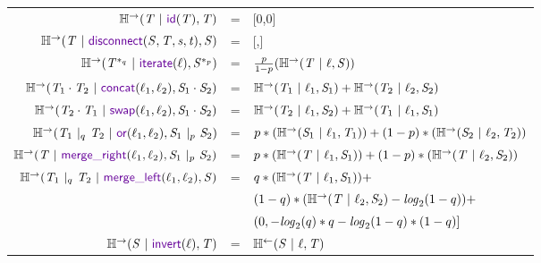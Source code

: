 \documentclass[acmsmall,screen,anonymous]{acmart}
\begin{document}
\begin{center}
  \begin{tabular}{rcl}
    $\REntropyOf{\RegexAlt \Given \IdentityLensOf{\RegexAlt}, \RegexAlt}$
    & =
    & [0,0]\\
    
    $\REntropyOf{\RegexAlt \Given \DisconnectOf{\Regex}{\RegexAlt}{\String}{\StringAlt}, \Regex}$
    & =
    & [\EntropyOf{\RegexAlt},\EntropyOf{\RegexAlt}]\\

    $\REntropyOf{\PRegexStar{\RegexAlt}{\ProbabilityAlt} \Given \IterateLensOf{\Lens}, \PRegexStar{\Regex}{\Probability}}$
    & =
    & $\frac{p}{1-p}(\mathbb{H}^\rightarrow(\mathit{T} ~|~ \mathit{\ell}, \mathit{S}))$\\
    
    $\REntropyOf{\RegexAlt_1 \Concat \RegexAlt_2 \Given \ConcatLensOf{\Lens_1}{\Lens_2}, \Regex_1 \Concat \Regex_2}$
    & =
    & $\mathbb{H}^\rightarrow(\mathit{T}_1 ~|~ \mathit{\ell}_1, \mathit{S}_1) + \mathbb{H}^\rightarrow(\mathit{T}_2 ~|~ \mathit{\ell}_2, \mathit{S}_2)$\\
    
    $\REntropyOf{\RegexAlt_2 \Concat \RegexAlt_1 \Given \SwapLensOf{\Lens_1}{\Lens_2}, \Regex_1 \Concat \Regex_2}$
    & =
    & $\mathbb{H}^\rightarrow(\mathit{T}_2 ~|~ \mathit{\ell}_1, \mathit{S}_2) + \mathbb{H}^\rightarrow(\mathit{T}_1 ~|~ \mathit{\ell}_1, \mathit{S}_1)$\\
    
    $\REntropyOf{\PRegexOr{\RegexAlt_1}{\RegexAlt_2}{\ProbabilityAlt} \Given \OrLensOf{\Lens_1}{\Lens_2}, \PRegexOr{\Regex_1}{\Regex_2}{\Probability}}$
    & =
    & $p*(\mathbb{H}^\rightarrow(\mathit{S}_1 ~|~ \mathit{\ell}_1, \mathit{T}_1) ) + (1-p)*(\mathbb{H}^\rightarrow(\mathit{S}_2 ~|~ \mathit{\ell}_2, \mathit{T}_2))$\\
    
    $\REntropyOf{\RegexAlt \Given \MergeROf{\Lens_1}{\Lens_2}, \PRegexOr{\Regex_1}{\Regex_2}{\Probability}}$
    & =
    & $p*(\mathbb{H}^\rightarrow(\mathit{T} ~|~ \mathit{\ell}_1, \mathit{S}_1)) + (1-p)*(\mathbb{H}^\rightarrow(\mathit{T} ~|~ \mathit{\ell}_2, \mathit{S}_2))$\\
    
    $\REntropyOf{\PRegexOr{\RegexAlt_1}{\RegexAlt_2}{\ProbabilityAlt} \Given \MergeLOf{\Lens_1}{\Lens_2}, \Regex}$
    & =
    & $q*(\mathbb{H}^\rightarrow(\mathit{T} ~|~ \mathit{\ell}_1, \mathit{S}_1)) + $\\
    &
    & $(1-q)*(\mathbb{H}^\rightarrow(\mathit{T} ~|~ \mathit{\ell}_2, \mathit{S}_2) - \mathit{log}_2(1 - q))+$\\
    &
    & $(0, -\mathit{log}_2(q)*q -\mathit{log}_2(1 - q)*(1-q)]$\\
    
    $\REntropyOf{\Regex \Given \InvertOf{\Lens}, \RegexAlt}$
    & =
    & $\mathbb{H}^\leftarrow(\mathit{S} ~|~ \mathit{\ell}, \mathit{T})$\\
  \end{tabular}
\end{center}
\end{document}
